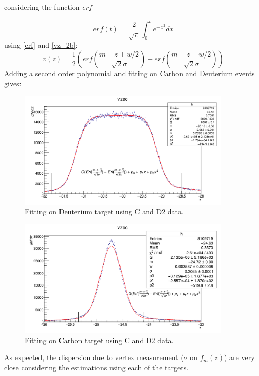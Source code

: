 \documentclass[12pt,letterpaper]{article}
\begin{document}
considering the function $erf$

\begin{equation}
erf(t) = \frac{2}{\sqrt{\pi}}\int_0^t e^{-x^2}dx \label{erf}
\end{equation}
using \eqref{erf} and \eqref{vz_2b}:
%
\begin{equation}
v(z) = \frac{1}{2}\left(erf(\frac{m-z+w/2}{\sqrt{2}\sigma} ) - erf(\frac{m-z-w/2}{\sqrt{2}\sigma} )\right)
\end{equation}
Adding a second order polynomial and fitting on Carbon and Deuterium events gives:
%
\begin{figure}[!ht]
\includegraphics[width=0.9\textwidth]{CD_D_fit_pol2.gif}
\caption{Fitting on Deuterium target using C and D2 data.}
\end{figure}
%
\begin{figure}[!hb]
\includegraphics[width=0.9\textwidth]{CD_C_fit_pol2.gif}
\caption{Fitting on Carbon target using C and D2 data.}
\end{figure}
%
As expected, the dispersion due to vertex measurement ($\sigma$ on $f_m(z)$) are very close considering the estimations using each of the targets.

\end{document}

